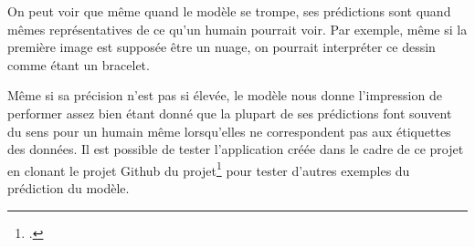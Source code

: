 On peut voir que même quand le modèle se trompe, ses prédictions sont quand mêmes représentatives de ce qu'un humain pourrait voir.
Par exemple, même si la première image est supposée être un nuage, on pourrait interpréter ce dessin comme étant un bracelet.


Même si sa précision n'est pas si élevée, le modèle nous donne l'impression de performer assez bien étant donné que la plupart de ses prédictions font souvent du sens pour un humain même lorsqu'elles ne correspondent pas aux étiquettes des données.
Il est possible de tester l'application créée dans le cadre de ce projet en clonant le projet Github du projet\footcite{Github:repo} pour tester d'autres exemples du prédiction du modèle.
